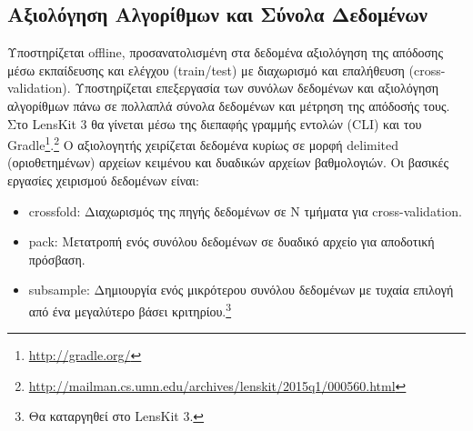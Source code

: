 \subsection{Αξιολόγηση Αλγορίθμων και Σύνολα Δεδομένων}
Υποστηρίζεται {\en offline}, προσανατολισμένη στα δεδομένα αξιολόγηση της απόδοσης μέσω εκπαίδευσης και ελέγχου ({\en train/test}) με διαχωρισμό και επαλήθευση ({\en cross-validation}). Υποστηρίζεται επεξεργασία των συνόλων δεδομένων και αξιολόγηση αλγορίθμων πάνω σε πολλαπλά σύνολα δεδομένων και μέτρηση της απόδοσής τους. Στο {\en LensKit 3} θα γίνεται μέσω της διεπαφής γραμμής εντολών ({\en CLI}) και του {\en Gradle}\footnote{\en \url{http://gradle.org/}}.\footnote{\en \url{http://mailman.cs.umn.edu/archives/lenskit/2015q1/000560.html}} Ο αξιολογητής χειρίζεται δεδομένα κυρίως σε μορφή {\en delimited} (οριοθετημένων) αρχείων κειμένου και δυαδικών αρχείων βαθμολογιών. Οι βασικές εργασίες χειρισμού δεδομένων είναι: 
\begin{itemize}
 \item {\en crossfold}: Διαχωρισμός της πηγής δεδομένων σε Ν τμήματα για {\en cross-validation}.
 \item {\en pack}: Μετατροπή ενός συνόλου δεδομένων σε δυαδικό αρχείο για αποδοτική πρόσβαση.
 \item {\en subsample}: Δημιουργία ενός μικρότερου συνόλου δεδομένων με τυχαία επιλογή από ένα μεγαλύτερο βάσει κριτηρίου.\footnote{Θα καταργηθεί στο {\en LensKit 3}.}
\end{itemize}
